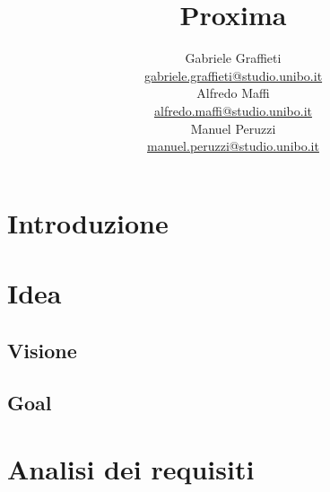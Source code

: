 \documentclass[a4paper,12pt]{report}
\title{\Huge \textbf{Proxima} \\
	\vspace{10pt}
	\vspace{20pt}
}
\author{
	Gabriele Graffieti \\ \small \url{gabriele.graffieti@studio.unibo.it}
	\vspace{15pt}
	\\
	Alfredo Maffi \\ \small \url{alfredo.maffi@studio.unibo.it}
	\vspace{15pt}
	\\
	Manuel Peruzzi \\ \small \url{manuel.peruzzi@studio.unibo.it}
}
\date{}
\begin{document}
\maketitle
{}


\tableofcontents

\chapter{Introduzione}

\chapter{Idea}
\section{Visione}
\section{Goal}
 
\chapter{Analisi dei requisiti} 
\end{document}
